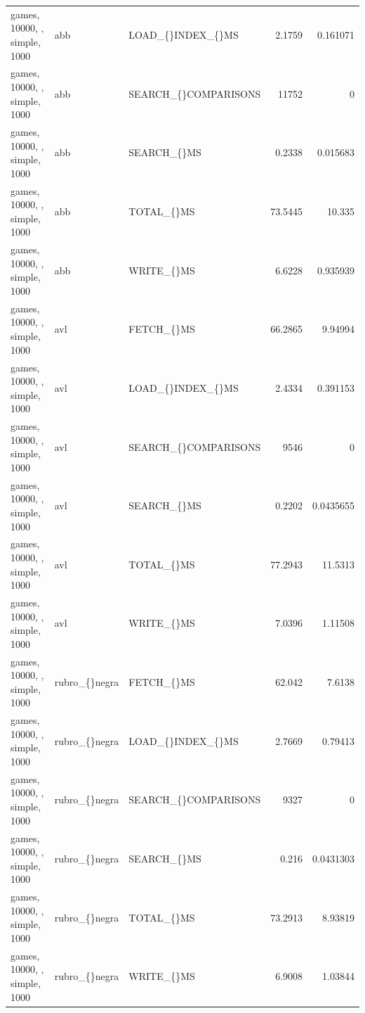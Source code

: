 \begin{longtable}{p{4cm}p{1.4cm}p{2.6cm}rr}
games, 10000, , simple, 1000 & abb & LOAD\_\allowbreak\{\}INDEX\_\allowbreak\{\}MS & 2.1759 & 0.161071\\
games, 10000, , simple, 1000 & abb & SEARCH\_\allowbreak\{\}COMPARISONS & 11752 & 0\\
games, 10000, , simple, 1000 & abb & SEARCH\_\allowbreak\{\}MS & 0.2338 & 0.015683\\
games, 10000, , simple, 1000 & abb & TOTAL\_\allowbreak\{\}MS & 73.5445 & 10.335\\
games, 10000, , simple, 1000 & abb & WRITE\_\allowbreak\{\}MS & 6.6228 & 0.935939\\
games, 10000, , simple, 1000 & avl & FETCH\_\allowbreak\{\}MS & 66.2865 & 9.94994\\
games, 10000, , simple, 1000 & avl & LOAD\_\allowbreak\{\}INDEX\_\allowbreak\{\}MS & 2.4334 & 0.391153\\
games, 10000, , simple, 1000 & avl & SEARCH\_\allowbreak\{\}COMPARISONS & 9546 & 0\\
games, 10000, , simple, 1000 & avl & SEARCH\_\allowbreak\{\}MS & 0.2202 & 0.0435655\\
games, 10000, , simple, 1000 & avl & TOTAL\_\allowbreak\{\}MS & 77.2943 & 11.5313\\
games, 10000, , simple, 1000 & avl & WRITE\_\allowbreak\{\}MS & 7.0396 & 1.11508\\
games, 10000, , simple, 1000 & rubro\_\allowbreak\{\}negra & FETCH\_\allowbreak\{\}MS & 62.042 & 7.6138\\
games, 10000, , simple, 1000 & rubro\_\allowbreak\{\}negra & LOAD\_\allowbreak\{\}INDEX\_\allowbreak\{\}MS & 2.7669 & 0.79413\\
games, 10000, , simple, 1000 & rubro\_\allowbreak\{\}negra & SEARCH\_\allowbreak\{\}COMPARISONS & 9327 & 0\\
games, 10000, , simple, 1000 & rubro\_\allowbreak\{\}negra & SEARCH\_\allowbreak\{\}MS & 0.216 & 0.0431303\\
games, 10000, , simple, 1000 & rubro\_\allowbreak\{\}negra & TOTAL\_\allowbreak\{\}MS & 73.2913 & 8.93819\\
games, 10000, , simple, 1000 & rubro\_\allowbreak\{\}negra & WRITE\_\allowbreak\{\}MS & 6.9008 & 1.03844\\
\hline
\end{longtable}
\normalsize
